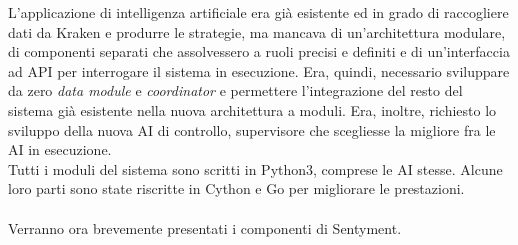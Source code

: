 \documentclass[a4paper,12pt]{report}
\begin{document}
L'applicazione di intelligenza artificiale era già esistente ed in grado di raccogliere dati da Kraken e produrre le strategie, ma mancava di un'architettura modulare, di componenti separati che assolvessero a ruoli precisi e definiti e di un'interfaccia ad API per interrogare il sistema in esecuzione. Era, quindi, necessario sviluppare da zero \textit{data module} e \textit{coordinator} e permettere l'integrazione del resto del sistema già esistente nella nuova architettura a moduli. Era, inoltre, richiesto lo sviluppo della nuova AI di controllo, supervisore che scegliesse la migliore fra le AI in esecuzione.\\
Tutti i moduli del sistema sono scritti in Python3, comprese le AI stesse. Alcune loro parti sono state riscritte in Cython e Go per migliorare le prestazioni.
\\~\\ Verranno ora brevemente presentati i componenti di Sentyment.
\end{document}
